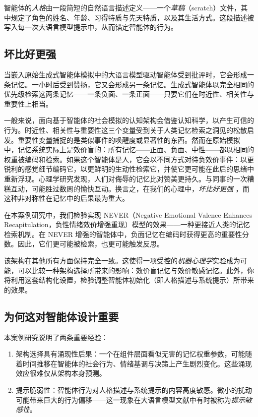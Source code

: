 智能体的\textit{人格}由一段简短的自然语言描述定义——一个{\em 草稿}（scratch）文件，其中规定了角色的姓名、年龄、习得特质与先天特质，以及其生活方式。这段描述被写入每一次大语言模型提示中，从而锚定智能体的行为。

\subsection{坏比好更强}

当嵌入原始生成式智能体模拟中的大语言模型驱动智能体受到批评时，它会形成一条记忆。一小时后受到赞扬，它又会形成另一条记忆。生成式智能体以完全相同的优先级检索这两条记忆——一条负面、一条正面——只要它们在时近性、相关性与重要性上相当。

一般来说，面向基于智能体的社会模拟的认知架构会借鉴认知科学，以产生可信的行为。时近性、相关性与重要性这三个变量受到关于人类记忆检索之洞见的松散启发。重要性变量捕捉的是类似事件的唤醒度或显著性的东西。然而在原始模拟 \citep{park2022social} 中，记忆系统实际上是效价盲的：所有记忆——正面、负面、中性——都以相同的权重被编码和检索。如果这个智能体是人，它会以不同方式对待负效价事件：以更锐利的感觉细节编码它，以更鲜明的生动性检索它，并使它更可能在此后的思绪中重新浮现。心理学研究发现，人们对侮辱的记忆比对赞美更持久。与同事的一次糟糕互动，可能胜过数周的愉快互动。换言之，在我们的心理中，{\em 坏比好更强} \citep{baumeister2001bad}，而这种非对称性在记忆中的后果最为重大。

在本案例研究中，我们检验实现 NEVER（Negative Emotional Valence Enhances Recapitulation，负性情绪效价增强重现）模型的效果——一种更接近人类的记忆检索机制。在 NEVER 增强的智能体中，负面记忆在编码时获得更高的重要性分数。因此，它们更可能被检索，也更可能触发反思。

该架构在其他所有方面保持完全一致。这使得一项受控的{\em 机器心理学}实验成为可能，可以比较一种架构选择所带来的影响：效价盲记忆与效价敏感记忆。此外，你将利用这套结构化设置，检验调整智能体初始化（即人格描述与系统提示）所带来的效果。

\subsection{为何这对智能体设计重要}

本案例研究说明了两条重要经验：
\begin{enumerate}
    \item 架构选择具有涌现性后果：一个在组件层面看似无害的记忆权重参数，可能随着时间推移在智能体的社会行为、情绪基调与决策上产生剧烈变化。这些涌现效应很难仅从架构本身预测。
    \item 提示脆弱性：智能体行为对人格描述与系统提示的内容高度敏感。微小的扰动可能带来巨大的行为偏移——这一现象在大语言模型文献中有时被称为\emph{提示敏感性}。
\end{enumerate}
